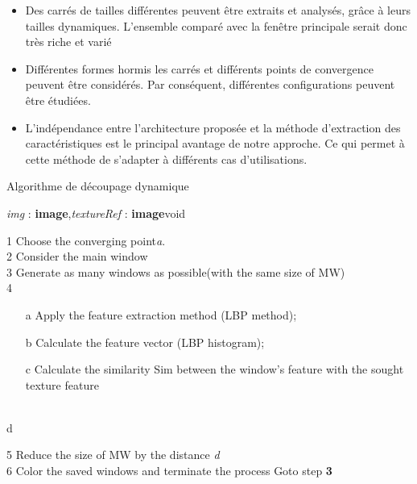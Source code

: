 \begin{itemize}
\item Des carrés de tailles différentes peuvent être extraits et analysés, grâce à leurs tailles dynamiques. L'ensemble comparé avec la fenêtre principale serait donc très riche et varié\\

\item Différentes formes hormis les carrés et différents points de convergence peuvent être considérés. Par conséquent, différentes configurations peuvent être étudiées.\\

\item L'indépendance entre l'architecture proposée et la méthode d'extraction des caractéristiques est le principal avantage de notre approche. Ce qui permet à cette méthode de s'adapter à différents cas d'utilisations.\\

\end{itemize}

\label{Algorithme de découpage dynamique}
\begin{algorithme}[H]
\caption{Algorithme de découpage dynamique}
{\textit{img} : \textbf{image},\textit{textureRef} : \textbf{image}}{void}
{

1 Choose the converging point\textit{a}.\\
2  Consider the main window\\
3  Generate as many windows as possible(with the same size of MW)\\

4 
{
		\begin{itemize}
			\item[a] Apply the feature extraction method (LBP method);
			\item[b] Calculate the feature vector (LBP histogram);
			\item[c] Calculate the similarity Sim between the window’s feature with the sought texture feature
 			
		\end{itemize}\\

		d 
}

5 Reduce the size of MW by the distance \textit{d}\\
6 
	{
		Color the saved windows and terminate the process
	}
	{
		Goto step \textbf{3}
	}
}
\end{algorithme}

